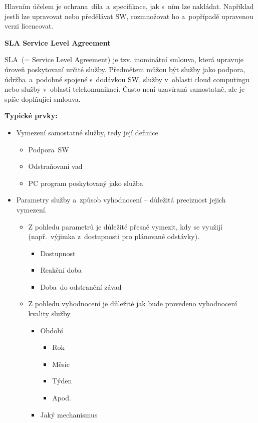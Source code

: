 Hlavním účelem je ochrana~díla~a~specifikace, jak s~ním lze nakládat. Například jestli lze upravovat nebo předělávat SW, rozmnožovat ho a~popřípadě upravenou verzi licencovat.
\clearpage


\begin{Large}
\textbf{SLA Service Level Agreement}
\end{Large}


SLA~(= Service Level Agreement) je tzv. inominátní smlouva, která upravuje úroveň poskytovaní určité služby. Předmětem můžou být služby jako podpora, údržba~a~podobné spojené s~dodávkou SW, služby v~oblasti cloud computingu nebo služby v~oblasti telekomunikací. Často není uzavíraná samostatně, ale je spíše doplňující smlouva.
\newline

\noindent\textbf{Typické prvky:}
\begin{itemize} 
	\item Vymezení samostatné služby, tedy její definice
	\begin{itemize} 
		\item Podpora~SW
		\item Odstraňovaní vad
		\item PC program poskytovaný jako služba
	\end{itemize}
	\item Parametry služby a~způsob vyhodnocení -- důležitá preciznost jejich vymezení.
	\begin{itemize} 
		\item Z pohledu parametrů je důležité přesně vymezit, kdy se využijí (např.\ výjimka z~dostupnosti pro plánované odstávky).
		\begin{itemize} 
			\item Dostupnost
			\item Reakční doba
			\item Doba~do odstranění závad
		\end{itemize}
		\item Z pohledu vyhodnocení je důležité jak bude provedeno vyhodnocení kvality služby
		\begin{itemize} 
			\item Období
			\begin{itemize} 
				\item Rok
				\item Měsíc
				\item Týden
				\item Apod.
			\end{itemize}
			\item Jaký mechanismus

\end{itemize}
\end{itemize}
\end{itemize}
